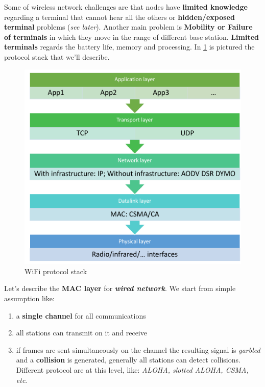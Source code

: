 \documentclass[10pt,a4paper]{report}
\theoremstyle{definition}
\begin{document}
Some of wireless network challenges are that nodes have  \textbf{limited knowledge} regarding a terminal that cannot hear all the others or \textbf{hidden/exposed terminal} problems (\textit{see later}). Another main problem is \textbf{Mobility or Failure of terminals} in which they move in the range of different base station. \textbf{Limited terminals} regards the battery life, memory and processing.
In \ref{protocol-stack} is pictured the protocol stack that we'll describe.
\begin{figure}
	\centering\includegraphics[scale=0.50]{images/Pasted image 20230224170808.png}
	\caption{WiFi protocol stack}
	\label{protocol-stack}
\end{figure}


Let's describe the \textbf{MAC layer} for \textbf{\textit{wired network}}. We start from simple assumption like:
\begin{enumerate}
	\item 
	a \textbf{single channel} for all communications
	\item 
	all stations can transmit on it and receive
	\item 
	if frames are sent simultaneously on the channel the resulting signal is \textit{garbled} and a \textbf{collision} is generated, generally all stations can detect collisions.
	Different protocol are at this level, like: \textit{ALOHA, slotted ALOHA, CSMA, etc}.
\end{enumerate}
\end{document}
